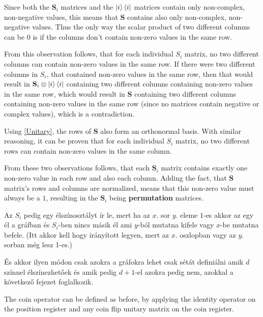 Since both the $\mathbf{S}_i$ matrices and the $\ket{i}\bra{i}$ matrices contain only non-complex, non-negative values, this means that $\mathbf{S}$ contains also only non-complex, non-negative values. Thus the only way the scalar product of two different columns can be $0$ is if the columns don't contain non-zero values in the same row.

From this observation follows, that for each individual $S_i$ matrix, no two different columns can contain non-zero values in the same row. If there were two different columns in $S_i$, that contained non-zero values in the same row, then that would result in $\mathbf{S}_i \otimes \ket{i}\bra{i}$ containing two different columns containing non-zero values in the same row, which would result in $\mathbf{S}$ containing two different columns containing non-zero values in the same row (since no matrices contain negative or complex values), which is a contradiction.

Using \hyperref[Unitary]{[Unitary]}, the rows of $\mathbf{S}$ also form an orthonormal basis. With similar reasoning, it can be proven that for each individual $S_i$ matrix, no two different rows can contain non-zero values in the same column.

From these two observations follows, that each $\mathbf{S}_i$ matrix contains exactly one non-zero value in each row and also each column. Adding the fact, that $\mathbf{S}$ matrix's rows and columns are normalized, means that this non-zero value must always be a $1$, resulting in the $\mathbf{S}_i$ being \textbf{permutation} matrices.




Az $S_i$ pedig egy élszínosztályt ír le, mert ha az $x.$ sor $y.$ eleme $1$-es akkor az egy él a gráfban és $S_i$-ben nincs másik él ami $y$-ból mutatna kifele vagy $x$-be mutatna befele. (Itt akkor kell hogy irányított legyen, mert az $x.$ oszlopban vagy az $y.$ sorban még lesz 1-es.)

És akkor ilyen módon csak azokra a gráfokra lehet csak sétát definiálni amik $d$ színnel élszínezhetőek és amik pedig $d+1$-el azokra pedig nem, azokkal a következő fejezet foglalkozik.





The coin operator can be defined as before, by applying the identity operator on the position register and any coin flip unitary matrix on the coin register.

